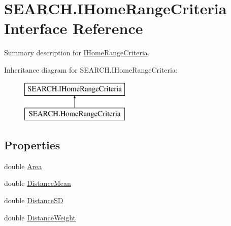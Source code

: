 \hypertarget{interface_s_e_a_r_c_h_1_1_i_home_range_criteria}{\section{S\-E\-A\-R\-C\-H.\-I\-Home\-Range\-Criteria Interface Reference}
\label{interface_s_e_a_r_c_h_1_1_i_home_range_criteria}
}


Summary description for \hyperlink{interface_s_e_a_r_c_h_1_1_i_home_range_criteria}{I\-Home\-Range\-Criteria}.  


Inheritance diagram for S\-E\-A\-R\-C\-H.\-I\-Home\-Range\-Criteria\-:\begin{figure}[H]
\begin{center}
\leavevmode
\includegraphics[height=2.000000cm]{interface_s_e_a_r_c_h_1_1_i_home_range_criteria}
\end{center}
\end{figure}
\subsection*{Properties}
\begin{DoxyCompactItemize}
\item 
double \hyperlink{interface_s_e_a_r_c_h_1_1_i_home_range_criteria_a9d4d6a0c16b83d50adaedc45aa4f679d}{Area}
\item 
double \hyperlink{interface_s_e_a_r_c_h_1_1_i_home_range_criteria_a430d7f41fbeb75e48cf015fd44a27d6b}{Distance\-Mean}
\item 
double \hyperlink{interface_s_e_a_r_c_h_1_1_i_home_range_criteria_a3a4572f0dcfd2b11d39d8a95ca1650b6}{Distance\-S\-D}
\item 
double \hyperlink{interface_s_e_a_r_c_h_1_1_i_home_range_criteria_aaa1d0ebf77c4d646ba37afc36cce8299}{Distance\-Weight}
\end{DoxyCompactItemize}


